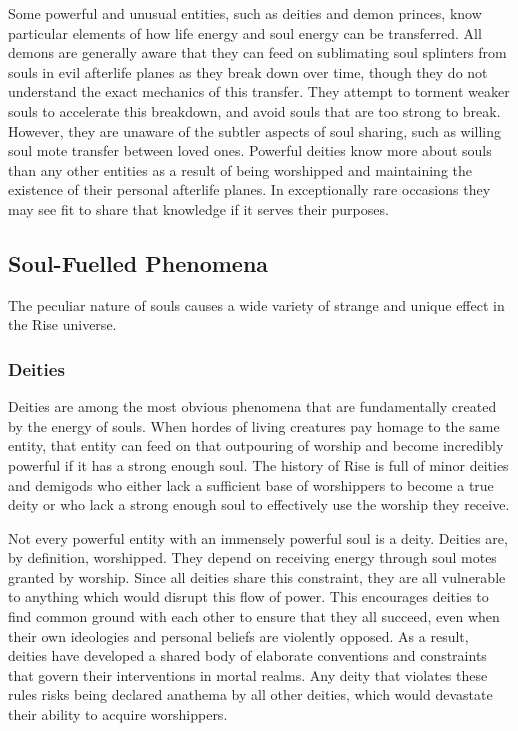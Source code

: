       Some powerful and unusual entities, such as deities and demon princes, know particular elements of how life energy and soul energy can be transferred.
      All demons are generally aware that they can feed on sublimating soul splinters from souls in evil afterlife planes as they break down over time, though they do not understand the exact mechanics of this transfer.
      They attempt to torment weaker souls to accelerate this breakdown, and avoid souls that are too strong to break.
      However, they are unaware of the subtler aspects of soul sharing, such as willing soul mote transfer between loved ones.
      Powerful deities know more about souls than any other entities as a result of being worshipped and maintaining the existence of their personal afterlife planes.
      In exceptionally rare occasions they may see fit to share that knowledge if it serves their purposes.

  \subsection{Soul-Fuelled Phenomena}

    The peculiar nature of souls causes a wide variety of strange and unique effect in the Rise universe.

    \subsubsection{Deities}
      Deities are among the most obvious phenomena that are fundamentally created by the energy of souls.
      When hordes of living creatures pay homage to the same entity, that entity can feed on that outpouring of worship and become incredibly powerful if it has a strong enough soul.
      The history of Rise is full of minor deities and demigods who either lack a sufficient base of worshippers to become a true deity or who lack a strong enough soul to effectively use the worship they receive.

      Not every powerful entity with an immensely powerful soul is a deity.
      Deities are, by definition, worshipped.
      They depend on receiving energy through soul motes granted by worship.
      Since all deities share this constraint, they are all vulnerable to anything which would disrupt this flow of power.
      This encourages deities to find common ground with each other to ensure that they all succeed, even when their own ideologies and personal beliefs are violently opposed.
      As a result, deities have developed a shared body of elaborate conventions and constraints that govern their interventions in mortal realms.
      Any deity that violates these rules risks being declared anathema by all other deities, which would devastate their ability to acquire worshippers.

